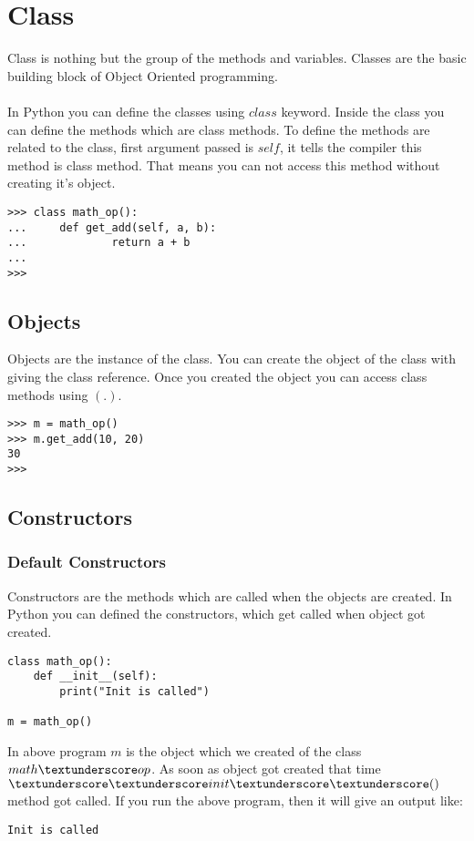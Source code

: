 \documentclass[letterpaper,12pt]{book}
\begin{document}
\section{Class}
Class is nothing but the group of the methods and variables. Classes are the basic building block of Object Oriented programming. 
\paragraph{}
In Python you can define the classes using $class$ keyword. Inside the class you can define the methods which are class methods. To define the methods are related to the class, first argument passed is $self$, it tells the compiler this method is class method. That means you can not access this method without creating it's object. 

\begin{lstlisting}
>>> class math_op():
...     def get_add(self, a, b):
...             return a + b
... 
>>> 
\end{lstlisting}
\subsection{Objects}
Objects are the instance of the class. You can create the object of the class with giving the class reference. Once you created the object you can access class methods using $(.)$.

\begin{lstlisting}
>>> m = math_op()
>>> m.get_add(10, 20)
30
>>>
\end{lstlisting}
\subsection{Constructors}
\subsubsection{Default Constructors}
Constructors are the methods which are called when the objects are created. In Python you can defined the constructors, which get called when object got created.

\begin{lstlisting}
class math_op():
    def __init__(self):
        print("Init is called")

m = math_op()
\end{lstlisting}
In above program $m$ is the object which we created of the class $math \textunderscore op$. As soon as object got created that time $\textunderscore\textunderscore init\textunderscore\textunderscore()$ method got called. 
If you run the above program, then it will give an output like:
\begin{lstlisting}
Init is called
\end{lstlisting}
\end{document}

